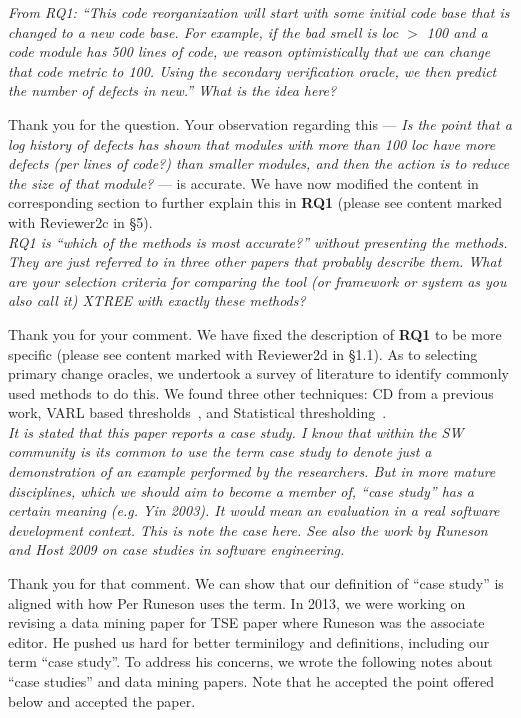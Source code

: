 \documentclass[twocolumn,5p]{elsarticle}
\newcommand{\tion}[1]{\S#1}
\newcommand{\review}[1]{\noindent\textit{#1\\}}
\theoremstyle{break}
\begin{document}
\review{From RQ1: ``This code reorganization will start with some initial 
	code base that is changed to a new code base. For example, if the bad smell 
	is loc $>$ 100 and a code module has 500 lines of code, we reason 
	optimistically that we can change that code metric to 100. Using the 
	secondary verification oracle, we then predict the number of defects in 
	new.'' What is the idea here?}

Thank you for the question. Your observation regarding this --- \emph{Is 
	the point that a log 
	history of defects has shown that modules 
	with more than 100 loc have more defects (per lines of code?) than smaller 
	modules, and then the action is to reduce the size of that module?} --- is 
accurate.  We have now modified the content in corresponding section to 
further explain this in \textbf{RQ1} (please see content marked with 
{\color{steel} Reviewer2c} in \tion{5}).\\	


\review{RQ1 is  ``which of the methods is most accurate?'' without 
	presenting 
	the methods. They are just referred to in three other papers that probably 
	describe them. What are your selection criteria for comparing the tool (or 
	framework or system as you also call it) XTREE with exactly these methods?}

Thank you for your comment. We have fixed the description of \textbf{RQ1} 
to be more specific (please see content marked with 
{\color{steel} Reviewer2d} in \tion{1.1}). As to selecting primary change 
oracles, we undertook a survey of literature to identify commonly used 
methods to do this. We found three other techniques: CD from a previous 
work, VARL based thresholds~\cite{Shatnawi10}, and Statistical 
thresholding~\cite{Alves2010}.
\\

\review{It is stated that this paper reports a case study. I know that within 
the SW community is its common to use the term case study to denote just a 
demonstration of an example performed by the researchers. But in more mature 
disciplines, which we should aim to become a member of, “case study” has a 
certain meaning (e.g. Yin 2003). It would mean an evaluation in a real software 
development context. This is note the case here. See also the work by Runeson 
and Host 2009 on case studies in software engineering.}

Thank you for that comment. We can show that our definition of
``case study'' is aligned with how Per Runeson uses the term.
In 2013, we were  working on revising a data mining paper for TSE paper
where Runeson was the associate editor. He pushed us hard for better 
terminilogy and definitions, including our term ``case study''. To address his 
concerns, we wrote the following
notes about ``case studies'' and data mining papers. Note that
he accepted the point offered below and accepted the paper.
\end{document}
